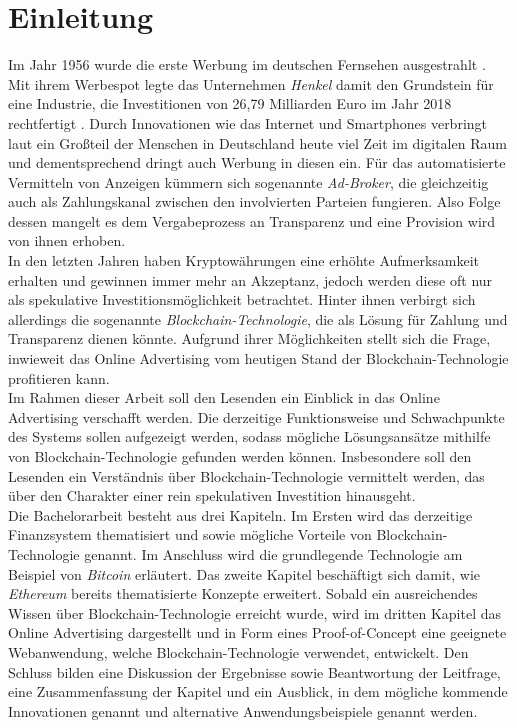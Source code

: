 \chapter{Einleitung}
Im Jahr 1956 wurde die erste Werbung im deutschen Fernsehen ausgestrahlt \cite[]{tagesspiegel_2016}. Mit ihrem Werbespot legte das Unternehmen \emph{Henkel} damit den Grundstein für eine Industrie, die Investitionen von 26,79 Milliarden Euro im Jahr 2018 rechtfertigt \cite[]{statista_werbung_2020}. Durch Innovationen wie das Internet und Smartphones verbringt laut \cite{statista_internetnutzung_2020} ein Großteil der Menschen in Deutschland heute viel Zeit im digitalen Raum und dementsprechend dringt auch Werbung in diesen ein. Für das automatisierte Vermitteln von Anzeigen kümmern sich sogenannte \emph{Ad-Broker}, die gleichzeitig auch als Zahlungskanal zwischen den involvierten Parteien fungieren. Also Folge dessen mangelt es dem Vergabeprozess an Transparenz und eine Provision wird von ihnen erhoben.\\

In den letzten Jahren haben Kryptowährungen eine erhöhte Aufmerksamkeit erhalten und gewinnen immer mehr an Akzeptanz, jedoch werden diese oft nur als spekulative Investitionsmöglichkeit betrachtet. Hinter ihnen verbirgt sich allerdings die sogenannte \emph{Blockchain-Technologie}, die als Lösung für Zahlung und Transparenz dienen könnte. Aufgrund ihrer Möglichkeiten stellt sich die Frage, inwieweit das Online Advertising vom heutigen Stand der Blockchain-Technologie profitieren kann.\\

Im Rahmen dieser Arbeit soll den Lesenden ein Einblick in das Online Advertising verschafft werden. Die derzeitige Funktionsweise und Schwachpunkte des Systems sollen aufgezeigt werden, sodass mögliche Lösungsansätze mithilfe von Blockchain-Technologie gefunden werden können. Insbesondere soll den Lesenden ein Verständnis über Blockchain-Technologie vermittelt werden, das über den Charakter einer rein spekulativen Investition hinausgeht.\\

Die Bachelorarbeit besteht aus drei Kapiteln. Im Ersten wird das derzeitige Finanzsystem thematisiert und sowie mögliche Vorteile von Blockchain-Technologie genannt. Im Anschluss wird die grundlegende Technologie am Beispiel von \emph{Bitcoin} erläutert. Das zweite Kapitel beschäftigt sich damit, wie \emph{Ethereum} bereits thematisierte Konzepte erweitert. Sobald ein ausreichendes Wissen über Blockchain-Technologie erreicht wurde, wird im dritten Kapitel das Online Advertising dargestellt und in Form eines Proof-of-Concept eine geeignete Webanwendung, welche Blockchain-Technologie verwendet, entwickelt. Den Schluss bilden eine Diskussion der Ergebnisse sowie Beantwortung der Leitfrage, eine Zusammenfassung der Kapitel und ein Ausblick, in dem mögliche kommende Innovationen genannt und alternative Anwendungsbeispiele genannt werden. 

